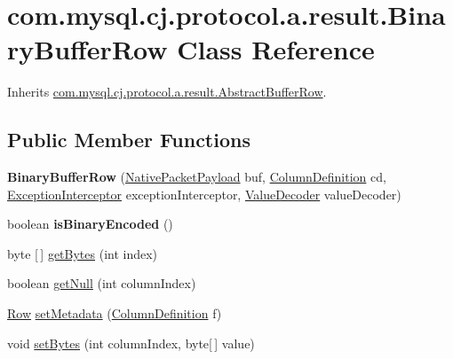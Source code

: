 \hypertarget{classcom_1_1mysql_1_1cj_1_1protocol_1_1a_1_1result_1_1_binary_buffer_row}{}\section{com.\+mysql.\+cj.\+protocol.\+a.\+result.\+Binary\+Buffer\+Row Class Reference}
\label{classcom_1_1mysql_1_1cj_1_1protocol_1_1a_1_1result_1_1_binary_buffer_row}


Inherits \mbox{\hyperlink{classcom_1_1mysql_1_1cj_1_1protocol_1_1a_1_1result_1_1_abstract_buffer_row}{com.\+mysql.\+cj.\+protocol.\+a.\+result.\+Abstract\+Buffer\+Row}}.

\subsection*{Public Member Functions}
\begin{DoxyCompactItemize}
\item 
\mbox{\label{classcom_1_1mysql_1_1cj_1_1protocol_1_1a_1_1result_1_1_binary_buffer_row_aad91e14d0208a114059292a386693301}} 
{\bfseries Binary\+Buffer\+Row} (\mbox{\hyperlink{classcom_1_1mysql_1_1cj_1_1protocol_1_1a_1_1_native_packet_payload}{Native\+Packet\+Payload}} buf, \mbox{\hyperlink{interfacecom_1_1mysql_1_1cj_1_1protocol_1_1_column_definition}{Column\+Definition}} cd, \mbox{\hyperlink{interfacecom_1_1mysql_1_1cj_1_1exceptions_1_1_exception_interceptor}{Exception\+Interceptor}} exception\+Interceptor, \mbox{\hyperlink{interfacecom_1_1mysql_1_1cj_1_1protocol_1_1_value_decoder}{Value\+Decoder}} value\+Decoder)
\item 
\mbox{\label{classcom_1_1mysql_1_1cj_1_1protocol_1_1a_1_1result_1_1_binary_buffer_row_a699d5aa259fbe51d4478babc94d39090}} 
boolean {\bfseries is\+Binary\+Encoded} ()
\item 
byte \mbox{[}$\,$\mbox{]} \mbox{\hyperlink{classcom_1_1mysql_1_1cj_1_1protocol_1_1a_1_1result_1_1_binary_buffer_row_a2d51fe0441a52cbc0d93b23a5c1c0364}{get\+Bytes}} (int index)
\item 
boolean \mbox{\hyperlink{classcom_1_1mysql_1_1cj_1_1protocol_1_1a_1_1result_1_1_binary_buffer_row_af16fb029bdd91774e95d8ee502a85e07}{get\+Null}} (int column\+Index)
\item 
\mbox{\hyperlink{interfacecom_1_1mysql_1_1cj_1_1result_1_1_row}{Row}} \mbox{\hyperlink{classcom_1_1mysql_1_1cj_1_1protocol_1_1a_1_1result_1_1_binary_buffer_row_a2bd5930ed5755dca5600e9ee96bad328}{set\+Metadata}} (\mbox{\hyperlink{interfacecom_1_1mysql_1_1cj_1_1protocol_1_1_column_definition}{Column\+Definition}} f)
\item 
void \mbox{\hyperlink{classcom_1_1mysql_1_1cj_1_1protocol_1_1a_1_1result_1_1_binary_buffer_row_ab30b2392287e18d1a0d7662a3090493a}{set\+Bytes}} (int column\+Index, byte\mbox{[}$\,$\mbox{]} value)
\end{DoxyCompactItemize}
